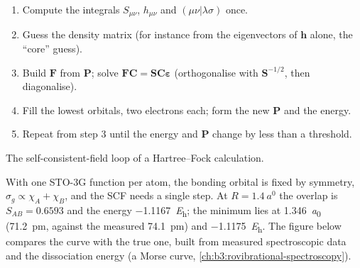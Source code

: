 \begin{method}\label{met:b3:computational-chemistry:scf}
\begin{enumerate}
  \item Compute the integrals $S_{\mu\nu}$, $h_{\mu\nu}$ and $(\mu\nu|\lambda\sigma)$ once.
  \item Guess the density matrix (for instance from the eigenvectors of
        $\mathbf h$ alone, the ``core'' guess).
  \item Build $\mathbf F$ from $\mathbf P$; solve $\mathbf F\mathbf C = \mathbf S\mathbf C
        \boldsymbol\varepsilon$ (orthogonalise with $\mathbf S^{-1/2}$, then diagonalise).
  \item Fill the lowest orbitals, two electrons each; form the new $\mathbf P$
        and the energy.
  \item Repeat from step 3 until the energy and $\mathbf P$ change by less than a
        threshold.
\end{enumerate}
\end{method}

\begin{omfigure}

{\small The self-consistent-field loop of a Hartree--Fock calculation.}
\end{omfigure}

\begin{example}\label{ex:b3:computational-chemistry:h2}
With one STO-3G function per atom, the bonding orbital is fixed by symmetry,
$\sigma_g \propto \chi_A + \chi_B$, and the SCF needs a single step. At $R =
\qty{1.4}{\bohr}$ the overlap is $S_{AB} = 0.6593$ and the energy
\qty{-1.1167}{\hartree}; the minimum lies at \qty{1.346}{\bohr} (\qty{71.2}{pm},
against the measured \qty{74.1}{pm}) and \qty{-1.1175}{\hartree}. The figure below
compares the curve with the true one, built from measured spectroscopic
data and the dissociation energy (a Morse curve, \cref{ch:b3:rovibrational-spectroscopy}).
\end{example}

